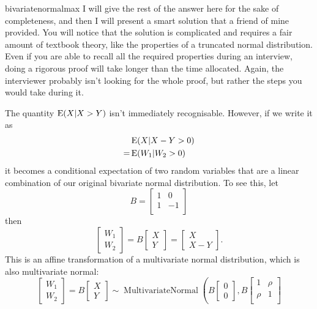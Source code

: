 \begin{answer}{bivariatenormalmax}
I will give the rest of the answer here for the sake of completeness, and then I will present a smart solution that a friend of mine provided.
You will notice that the solution is complicated and requires a fair amount of textbook theory, like the properties of a truncated normal distribution.
Even if you are able to recall all the required properties during an interview, doing a rigorous proof will take longer than the time allocated.
Again, the interviewer probably isn't looking for the whole proof, but rather the steps you would take during it.

The quantity $\operatorname{\mathrm{E}}(X|X > Y)$ isn't immediately recognisable.
However, if we write it as
\begin{align*}
 &\operatorname{\mathrm{E}}(X|X-Y > 0)  \\
=&\operatorname{\mathrm{E}}(W_1|W_2 > 0)
\end{align*}
it becomes a conditional expectation of two random variables that are a linear combination of our original bivariate normal distribution.
To see this, let
\[B =
\begin{bmatrix}
  1   &  0 \\
  1   & -1 \\
  \end{bmatrix}
\]
then
\[
\begin{bmatrix}
  W_1 \\ W_2
\end{bmatrix}
=
B
  \begin{bmatrix}
  X \\ Y
  \end{bmatrix}
  =
  \begin{bmatrix}
  X \\ X-Y
  \end{bmatrix}
  \text{.}
\]
This is an affine transformation of a multivariate normal distribution, which is also multivariate normal:
\[
\begin{bmatrix}
  W_1 \\ W_2
\end{bmatrix}
=
B
\begin{bmatrix}
X \\ Y
\end{bmatrix}
\sim
\operatorname{MultivariateNormal}
\left(
B
\begin{bmatrix}
0 \\ 0
\end{bmatrix}
  ,
  B
  \begin{bmatrix}
  1      &   \rho \\
  \rho   &   1    \\
  \end{bmatrix}
\]
\end{answer}
